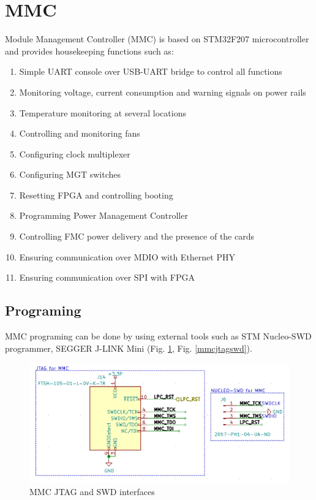 \documentclass[12pt,oneside,a4]{article}
\begin{document}
\section{MMC}
Module Management Controller (MMC) is based on STM32F207 microcontroller and provides housekeeping functions such as:
\begin{enumerate}
	\item Simple UART console over USB-UART bridge to control all functions
	\item Monitoring voltage, current consumption and warning signals on power rails
	\item Temperature monitoring at several locations
	\item Controlling and monitoring fans
	\item Configuring clock multiplexer
	\item Configuring MGT switches
	\item Resetting FPGA and controlling booting
	\item Programming Power Management Controller
	\item Controlling FMC power delivery and the presence of the cards
	\item Ensuring communication over MDIO with Ethernet PHY
	\item Ensuring communication over SPI with FPGA
\end{enumerate}

\subsection{Programing}
MMC programing can be done by using external tools such as STM Nucleo-SWD programmer, SEGGER J-LINK Mini (Fig. \ref{mmcjtag}, Fig. \ref{mmcjtagswd}).

\begin{figure}[H]
\begin{center}
\includegraphics[width=1\linewidth]{mmcjtag.png}
 \caption{MMC JTAG and SWD interfaces}\label{mmcjtag}
\end{center}
\end{figure}
\end{document}
